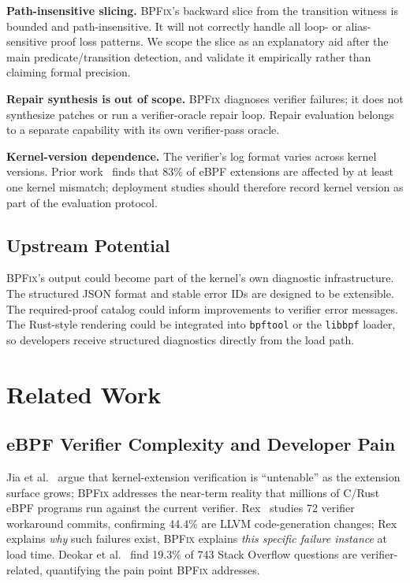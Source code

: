 \documentclass[sigplan,10pt,anonymous,review]{acmart}
\newcommand{\sys}{\textsc{BPFix}\xspace}
\begin{document}
\textbf{Path-insensitive slicing.}  {\sys}'s backward slice from the
transition witness is bounded and path-insensitive.  It will not correctly
handle all loop- or alias-sensitive proof loss patterns.  We scope the slice
as an explanatory aid after the main predicate/transition detection, and
validate it empirically rather than claiming formal precision.

\textbf{Repair synthesis is out of scope.}  \sys diagnoses verifier failures;
it does not synthesize patches or run a verifier-oracle repair loop.  Repair
evaluation belongs to a separate capability with its own verifier-pass oracle.

\textbf{Kernel-version dependence.}  The verifier's log format varies across
kernel versions.  Prior work~\cite{depsurf2025} finds that 83\% of eBPF
extensions are affected by at least one kernel mismatch; deployment studies
should therefore record kernel version as part of the evaluation protocol.

\subsection{Upstream Potential}

{\sys}'s output could become part of the kernel's own diagnostic
infrastructure.  The structured JSON format and stable error IDs are designed
to be extensible.  The required-proof catalog could inform
improvements to verifier error messages.  The Rust-style rendering could
be integrated into \texttt{bpftool} or the \texttt{libbpf} loader, so
developers receive structured diagnostics directly from the load path.

\section{Related Work}

\subsection{eBPF Verifier Complexity and Developer Pain}

Jia et al.~\cite{hotos2023verif} argue that kernel-extension verification
is ``untenable'' as the extension surface grows; \sys addresses the near-term
reality that millions of C/Rust eBPF programs run against the current verifier.
Rex~\cite{rex2025} studies 72 verifier workaround commits, confirming 44.4\% are
LLVM code-generation changes; Rex explains \emph{why} such failures exist, \sys
explains \emph{this specific failure instance} at load time.  Deokar et
al.~\cite{deokar2024} find 19.3\% of 743 Stack Overflow questions are
verifier-related, quantifying the pain point \sys addresses.
\end{document}
